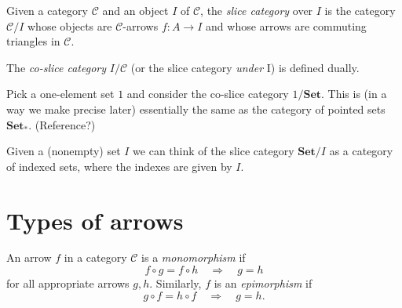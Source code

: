 \documentclass[article, a4paper, 11pt, oneside]{memoir}
\numberwithin{equation}{chapter}
\newcommand{\cat}[1]{\mathcal{#1}}
\newcommand{\ncat}[1]{\mathbf{#1}} %
\newcommand{\catSet}{\ncat{Set}}
\newcommand{\catC}{\cat{C}}
\begin{document}
\begin{definition}
    Given a category $\catC$ and an object $I$ of $\catC$, the \emph{slice category} over $I$ is the category $\catC/I$ whose objects are $\catC$-arrows $f \colon A \to I$ and whose arrows are commuting triangles in $\catC$.

    The \emph{co-slice category} $I/\catC$ (or the slice category \emph{under} I) is defined dually.
\end{definition}


\begin{examplebreak}
    \begin{enumexample}
        \item Pick a one-element set $1$ and consider the co-slice category $1/\catSet$. This is (in a way we make precise later) essentially the same as the category of pointed sets $\catSet_*$. (Reference?)
        
        \item Given a (nonempty) set $I$ we can think of the slice category $\catSet/I$ as a category of indexed sets, where the indexes are given by $I$.
    \end{enumexample}
\end{examplebreak}



\chapter{Types of arrows}

\begin{definition}
    An arrow $f$ in a category $\catC$ is a \emph{monomorphism} if
    \begin{equation*}
        f \circ g = f \circ h
            \quad \Rightarrow \quad
            g = h
    \end{equation*}
    for all appropriate arrows $g, h$. Similarly, $f$ is an \emph{epimorphism} if
    \begin{equation*}
        g \circ f = h \circ f
            \quad \Rightarrow \quad
            g = h.
    \end{equation*}
\end{definition}
\end{document}
